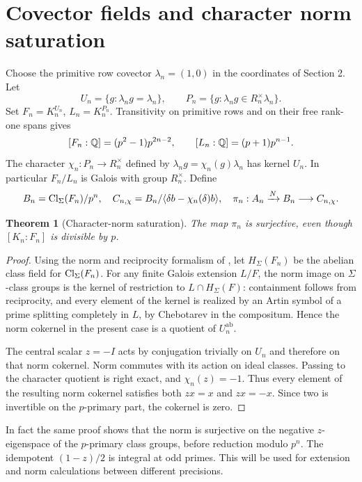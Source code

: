\documentclass[11pt,a4paper]{article}
\newtheorem{theorem}{Theorem}[section]
\theoremstyle{definition}\newtheorem{definition}[theorem]{Definition}
\theoremstyle{remark}\newtheorem{remark}[theorem]{Remark}
\numberwithin{equation}{section}
\begin{document}
\section{Covector fields and character norm saturation}
Choose the primitive row covector $\lambda_n=(1,0)$ in the coordinates of Section 2. Let
\[
U_n=\{g:\lambda_ng=\lambda_n\},\qquad
P_n=\{g:\lambda_ng\in R_n^\times\lambda_n\}.
\]
Set $F_n=K_n^{U_n}$, $L_n=K_n^{P_n}$. Transitivity on primitive rows and on their free rank-one spans gives
\begin{equation}\label{eq:degrees}
[F_n:\mathbb Q]=(p^2-1)p^{2n-2},\qquad
[L_n:\mathbb Q]=(p+1)p^{n-1}.
\end{equation}
The character $\chi_n:P_n\to R_n^\times$ defined by $\lambda_ng=\chi_n(g)\lambda_n$ has kernel $U_n$. In particular $F_n/L_n$ is Galois with group $R_n^\times$. Define
\[
B_n=\operatorname{Cl}_\Sigma(F_n)/p^n,\quad
C_{n,\chi}=B_n/\langle\delta b-\chi_n(\delta)b\rangle,
\quad \pi_n:A_n\xrightarrow{N}B_n\longrightarrow C_{n,\chi}.
\]
\begin{theorem}[Character-norm saturation]\label{th:normsurj}
The map $\pi_n$ is surjective, even though $[K_n:F_n]$ is divisible by $p$.
\end{theorem}
\begin{proof}
Using the norm and reciprocity formalism of \cite{Neukirch}, let $H_\Sigma(F_n)$ be the abelian class field for $\operatorname{Cl}_\Sigma(F_n)$. For any finite Galois extension $L/F$, the norm image on $\Sigma$-class groups is the kernel of restriction to $L\cap H_\Sigma(F)$: containment follows from reciprocity, and every element of the kernel is realized by an Artin symbol of a prime splitting completely in $L$, by Chebotarev in the compositum. Hence the norm cokernel in the present case is a quotient of $U_n^{\mathrm{ab}}$.

The central scalar $z=-I$ acts by conjugation trivially on $U_n$ and therefore on that norm cokernel. Norm commutes with its action on ideal classes. Passing to the character quotient is right exact, and $\chi_n(z)=-1$. Thus every element of the resulting norm cokernel satisfies both $zx=x$ and $zx=-x$. Since two is invertible on the $p$-primary part, the cokernel is zero.
\end{proof}
In fact the same proof shows that the norm is surjective on the negative $z$-eigenspace of the $p$-primary class groups, before reduction modulo $p^n$. The idempotent $(1-z)/2$ is integral at odd primes. This will be used for extension and norm calculations between different precisions.
\end{document}
